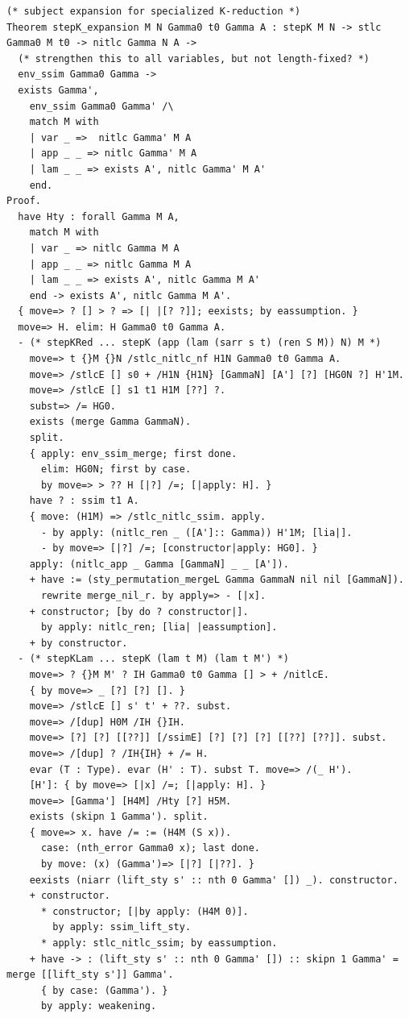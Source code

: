 \documentclass[10pt,a4paper]{article}
\begin{document}
\begin{lstlisting}[style=authorcoq]
(* subject expansion for specialized K-reduction *)
Theorem stepK_expansion M N Gamma0 t0 Gamma A : stepK M N -> stlc Gamma0 M t0 -> nitlc Gamma N A ->
  (* strengthen this to all variables, but not length-fixed? *)
  env_ssim Gamma0 Gamma ->
  exists Gamma',
    env_ssim Gamma0 Gamma' /\
    match M with
    | var _ =>  nitlc Gamma' M A
    | app _ _ => nitlc Gamma' M A
    | lam _ _ => exists A', nitlc Gamma' M A'
    end.
Proof.
  have Hty : forall Gamma M A,
    match M with
    | var _ => nitlc Gamma M A
    | app _ _ => nitlc Gamma M A
    | lam _ _ => exists A', nitlc Gamma M A'
    end -> exists A', nitlc Gamma M A'.
  { move=> ? [] > ? => [| |[? ?]]; eexists; by eassumption. }
  move=> H. elim: H Gamma0 t0 Gamma A.
  - (* stepKRed ... stepK (app (lam (sarr s t) (ren S M)) N) M *)
    move=> t {}M {}N /stlc_nitlc_nf H1N Gamma0 t0 Gamma A.
    move=> /stlcE [] s0 + /H1N {H1N} [GammaN] [A'] [?] [HG0N ?] H'1M.
    move=> /stlcE [] s1 t1 H1M [??] ?.
    subst=> /= HG0.
    exists (merge Gamma GammaN).
    split.
    { apply: env_ssim_merge; first done.
      elim: HG0N; first by case.
      by move=> > ?? H [|?] /=; [|apply: H]. }
    have ? : ssim t1 A.
    { move: (H1M) => /stlc_nitlc_ssim. apply.
      - by apply: (nitlc_ren _ ([A']:: Gamma)) H'1M; [lia|].
      - by move=> [|?] /=; [constructor|apply: HG0]. }
    apply: (nitlc_app _ Gamma [GammaN] _ _ [A']).
    + have := (sty_permutation_mergeL Gamma GammaN nil nil [GammaN]).
      rewrite merge_nil_r. by apply=> - [|x].
    + constructor; [by do ? constructor|].
      by apply: nitlc_ren; [lia| |eassumption].
    + by constructor.
  - (* stepKLam ... stepK (lam t M) (lam t M') *)
    move=> ? {}M M' ? IH Gamma0 t0 Gamma [] > + /nitlcE.
    { by move=> _ [?] [?] []. }
    move=> /stlcE [] s' t' + ??. subst.
    move=> /[dup] H0M /IH {}IH.
    move=> [?] [?] [[??]] [/ssimE] [?] [?] [?] [[??] [??]]. subst.
    move=> /[dup] ? /IH{IH} + /= H.
    evar (T : Type). evar (H' : T). subst T. move=> /(_ H').
    [H']: { by move=> [|x] /=; [|apply: H]. }
    move=> [Gamma'] [H4M] /Hty [?] H5M.
    exists (skipn 1 Gamma'). split.
    { move=> x. have /= := (H4M (S x)).
      case: (nth_error Gamma0 x); last done.
      by move: (x) (Gamma')=> [|?] [|??]. }
    eexists (niarr (lift_sty s' :: nth 0 Gamma' []) _). constructor.
    + constructor.
      * constructor; [|by apply: (H4M 0)].
        by apply: ssim_lift_sty.
      * apply: stlc_nitlc_ssim; by eassumption.
    + have -> : (lift_sty s' :: nth 0 Gamma' []) :: skipn 1 Gamma' = merge [[lift_sty s']] Gamma'.
      { by case: (Gamma'). }
      by apply: weakening.

\end{lstlisting}
\end{document}
